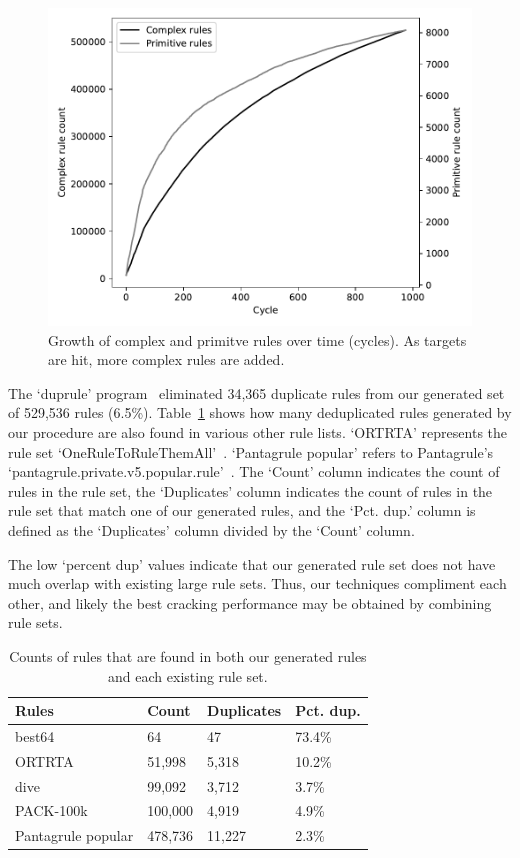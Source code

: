 \documentclass{article}
\begin{document}
\begin{figure}[h!]
\centering
\includegraphics[width=0.7\linewidth]
{figures/stats-rules_composites_size.pdf}
\caption{Growth of complex and primitve rules over time (cycles). As targets
are hit, more complex rules are added. }
\label{fig:rule-count}
\end{figure}

The `duprule' program~\autocite{duprule} eliminated 34,365 duplicate rules from our
generated set of 529,536 rules (6.5\%). Table~\ref{tab:dups} shows how many
deduplicated rules generated by our procedure are also found in various other
rule lists. `ORTRTA' represents the rule set
`OneRuleToRuleThemAll'~\autocite{ortrta}. `Pantagrule popular' refers to
Pantagrule's `pantagrule.private.v5.popular.rule'~\autocite{pantagrule}. The
`Count'
column indicates the count of rules in the rule set, the `Duplicates' column
indicates the count of rules in the rule set that match one of our generated
rules, and the `Pct. dup.' column is defined as the `Duplicates' column divided
by the `Count' column.

The low `percent dup' values indicate that our generated rule set
does
not have much overlap with existing large rule sets. Thus, our techniques
compliment each other, and likely the best cracking performance may be obtained
by combining rule sets.


\begin{table}
\centering
\begin{tabular}{|l|l|l|l|}
    \hline
    Rules & Count & Duplicates & Pct. dup. \\
    \hline
    best64 & 64 & 47 & 73.4\% \\
    ORTRTA & 51,998 & 5,318 & 10.2\% \\
    dive & 99,092 & 3,712 & 3.7\% \\
    PACK-100k & 100,000 & 4,919 & 4.9\% \\
    Pantagrule popular & 478,736 & 11,227 & 2.3\% \\
    \hline
\end{tabular}
\caption{Counts of rules that are found in both our generated rules and each
existing rule set.}
\label{tab:dups}
\end{table}
\end{document}
